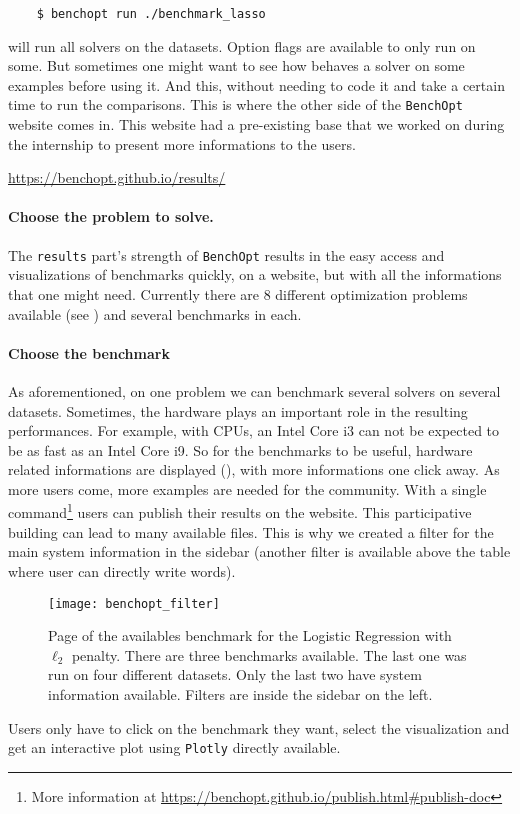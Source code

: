 \documentclass[../main.tex]{subfiles}
\begin{document}
\begin{center}
\begin{minipage}{8cm}
\begin{verbatim}
    $ benchopt run ./benchmark_lasso
\end{verbatim}
\end{minipage}
\end{center}
will run all solvers on the datasets. Option flags are available to only run on
some.
But sometimes one might want to see how behaves a solver on some examples
before using it.
And this, without needing to code it and take a certain time to
run the comparisons.
This is where the other side of the \texttt{BenchOpt} website comes in.
This website had a pre-existing base that we worked on during the internship to
present more informations to the users.
\begin{center}
    \url{https://benchopt.github.io/results/}
\end{center}
%
\paragraph*{Choose the problem to solve.}
%
The \texttt{results} part's strength of \texttt{BenchOpt} results in the easy
access and visualizations of benchmarks quickly, on a website, but with all the
informations that one might need.
Currently there are $8$ different optimization problems available
(see ) and several benchmarks in each.
%
\paragraph*{Choose the benchmark}
%
As aforementioned, on one problem we can benchmark several solvers on
several datasets.
Sometimes, the hardware plays an important role in the resulting
performances.
For example, with CPUs, an Intel Core i3 can not be expected
to be as fast as an Intel Core i9.
So for the benchmarks to be useful, hardware
related informations are displayed (), with more informations
one click away.
As more users come, more examples are needed for the community. With a single
command\footnote{More information at \url{https://benchopt.github.io/publish.html\#publish-doc}}
users can publish their results on the website.
This participative building can lead to many available files.
This is why we created a filter for the main system
information in the sidebar (another filter is available above the table where user
can directly write words).
\begin{figure}[h]
    \centering
    \texttt{[image: benchopt\_filter]}
    \caption{Page of the availables benchmark for the Logistic Regression with
    $\ell_2$ penalty. There are three benchmarks available. The last one was
    run on four different datasets. Only the last two have system information
    available. Filters are inside the sidebar on the left.}
    \label{fig:benchs}
\end{figure}
Users only have to click on the benchmark they want, select the visualization and
get an interactive plot using \texttt{Plotly} directly available.
%
\end{document}
